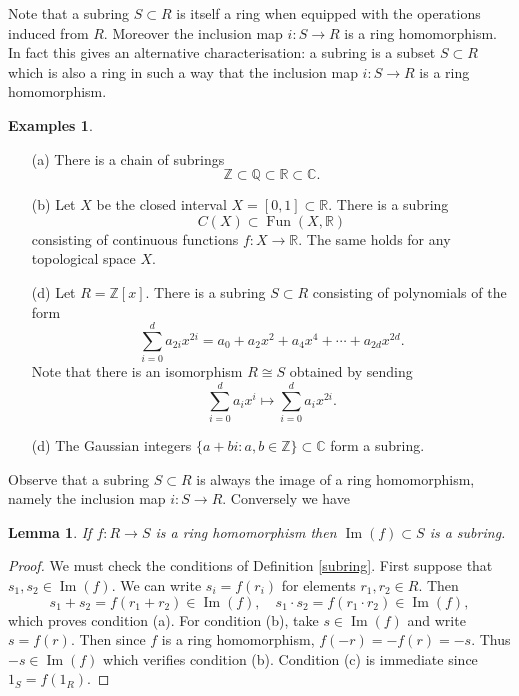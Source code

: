\documentclass [12pt,oneside,a4paper,mathscr]{amsart}
\newtheorem{lemma}[thm]{Lemma}
\theoremstyle{definition}
\newtheorem{examples}[thm]{Examples}
\newcommand {\C}{\mathbb C}
\newcommand{\Q}{\mathbb{Q}}
\newcommand{\R}{\mathbb{R}}
\newcommand{\Z}{\mathbb Z}
\newcommand{\isom}{\cong}
\newcommand{\Fun}{\operatorname{Fun}}
\newcommand{\im}{\operatorname{Im}}
\begin{document}
Note that a subring $S\subset R$ is itself a ring when equipped with the operations induced from $R$. Moreover the inclusion map $i\colon S \to R$ is a ring homomorphism. In fact this gives an alternative characterisation: a subring is a subset $S\subset R$ which is also  a ring in such a way that the inclusion map $i\colon S \to R$ is a ring homomorphism.

\begin{examples}
\label{eg_subrings}
\begin{itemize}
\item[(a)] There is a chain of subrings
\[\Z \subset \Q \subset\R \subset \C.\]


\item[(b)] Let $X$ be the closed interval  $X=[0,1]\subset \R$.
There is a subring
\[C(X)\subset  \Fun(X,\R)\]
consisting of continuous functions $f\colon X \to \R$. The same holds for any topological space $X$. 
\smallskip




\item[(d)] Let $R=\Z[x]$. There is a subring $S\subset R$ consisting of polynomials of the form
\[\sum_{i=0}^d a_{2i} x^{2i}=a_0 +a_2 x^2 + a_4 x^4 + \cdots +a_{2d} x^{2d}.\]
 Note that there is an isomorphism $R\isom S$ obtained by sending
\[\sum_{i=0}^d a_i x^i \mapsto \sum_{i=0}^d a_i x^{2i}.\]

\item[(d)] The Gaussian integers
$\{a + bi : a,b\in \Z\}\subset \C$
form a subring.
\end{itemize}
\end{examples}

Observe that a subring $S\subset R$ is always the image of a ring homomorphism, namely the inclusion map $i\colon S\to R$. Conversely we have

\begin{lemma}
If $f\colon R \to S$ is a ring homomorphism then $\im(f)\subset S$ is a subring.
\end{lemma}

\begin{proof}
We must check the conditions of Definition \ref{subring}. First suppose that $s_1,s_2\in \im(f)$. We can write $s_i=f(r_i)$ for elements $r_1,r_2\in R$. Then
\[s_1+s_2=f(r_1+r_2)\in \im(f), \quad s_1\cdot s_2=f(r_1\cdot r_2)\in \im(f),\]
which proves condition (a). For condition (b), take $s\in \im(f)$ and write $s=f(r)$. Then since $f$ is a ring homomorphism, $f(-r)=-f(r)=-s$. Thus  $-s\in \im(f)$ which verifies condition (b). Condition (c) is immediate since $1_S=f(1_R)$.
\end{proof}
\end{document}
